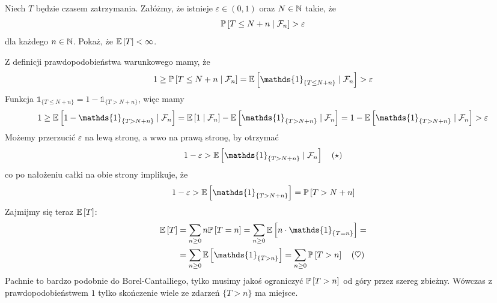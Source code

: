 \begin{problem}
  Niech $T$ będzie czasem zatrzymania. Załóżmy, że istnieje $\varepsilon\in(0,1)$ oraz $N\in\operatorname{\mathbb{N}}$ takie, że
  $$\prob{T\leq N+n}{\set{F}_n}>\varepsilon$$
  dla każdego $n\in\operatorname{\mathbb{N}}$. Pokaż, że $\expected{T}<\infty$.
\end{problem}

\begin{solution}
    Z definicji prawdopodobieństwa warunkowego mamy, że
  $$1\geq\prob{T\leq N+n}{\set{F}_n}=\expected{\mathds{1}_{\{T\leq N+n\}}}{\set{F}_n}>\varepsilon$$
  Funkcja $\mathds{1}_{\{T\leq N+n\}}=1-\mathds{1}_{\{T>N+n\}}$, więc mamy
  $$1\geq \expected{1-\mathds{1}_{\{T>N+n\}}}{\set{F}_n}=\expected{1}{\set{F}_n}-\expected{\mathds{1}_{\{T>N+n\}}}{\set{F}_n}=1-\expected{\mathds{1}_{\{T>N+n\}}}{\set{F}_n}>\varepsilon$$
  Możemy przerzucić $\varepsilon$ na lewą stronę, a wwo na prawą stronę, by otrzymać
  $$1-\varepsilon > \expected{\mathds{1}_{\{T>N+n\}}}{\set{F}_n}\quad(\star)$$
  co po nałożeniu całki na obie strony implikuje, że
  $$1-\varepsilon>\expected{\mathds{1}_{\{T>N+n\}}}=\prob{T>N+n}$$
  Zajmijmy się teraz $\expected{T}$:
  \begin{align*}
    \expected{T}&=\sum_{n\geq0} n\prob{T=n}=\sum_{n\geq0} \expected{n\cdot \mathds{1}_{\{T=n\}}}=\\ 
                &=\sum_{n\geq0}\expected{\mathds{1}_{\{T> n\}}}=\sum_{n\geq 0}\prob{T>n}\quad (\heartsuit)
  \end{align*}
  Pachnie to bardzo podobnie do Borel-Cantalliego, tylko musimy jakoś ograniczyć $\prob{T>n}$ od góry przez szereg zbieżny. Wówczas z prawdopodobieństwem $1$ tylko skończenie wiele ze zdarzeń $\{T>n\}$ ma miejsce.


\end{solution}
